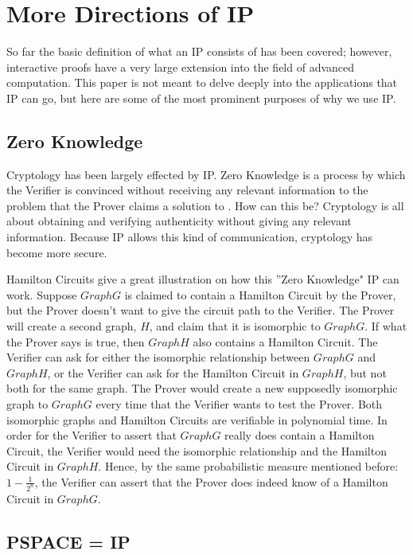 \documentclass[12pt]{article}
\begin{document}
\section{More Directions of IP}

So far the basic definition of what an IP consists of has been covered; however, interactive proofs have a very large extension into the field of advanced computation. This paper is not meant to delve deeply into the applications that IP can go, but here are some of the most prominent purposes of why we use IP.

\subsection{Zero Knowledge}

Cryptology has been largely effected by IP. Zero Knowledge is a process by which the Verifier is convinced without receiving any relevant information to the problem that the Prover claims a solution to \cite{zk}. How can this be? Cryptology is all about obtaining and verifying authenticity without giving any relevant information. Because IP allows this kind of communication, cryptology has become more secure.

Hamilton Circuits give a great illustration on how this ''Zero Knowledge" IP can work. Suppose $Graph G$ is claimed to contain a Hamilton Circuit by the Prover, but the Prover doesn't want to give the circuit path to the Verifier. The Prover will create a second graph, $H$, and claim that it is isomorphic to $Graph G$. If what the Prover says is true, then $Graph H$ also contains a Hamilton Circuit. The Verifier can ask for either the isomorphic relationship between $Graph G$ and $Graph H$, or the Verifier can ask for the Hamilton Circuit in $Graph H$, but not both for the same graph. The Prover would create a new supposedly isomorphic graph to $Graph G$ every time that the Verifier wants to test the Prover. Both isomorphic graphs and Hamilton Circuits are verifiable in polynomial time. In order for the Verifier to assert that $Graph G$ really does contain a Hamilton Circuit, the Verifier would need the isomorphic relationship and the Hamilton Circuit in $Graph H$. Hence, by the same probabilistic measure mentioned before: $1 - \frac{1}{2^n}$, the Verifier can assert that the Prover does indeed know of a Hamilton Circuit in $Graph G$.

\subsection{PSPACE = IP}
\end{document}
